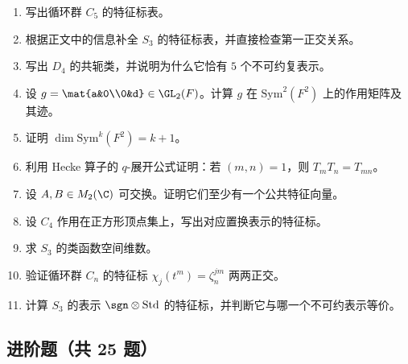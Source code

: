\begin{enumerate}[label={\textbf{习题8.\arabic*.}}, wide=0pt, leftmargin=3.2em]
\item \basic 写出循环群 $C_5$ 的特征标表。

\item \basic 根据正文中的信息补全 $S_3$ 的特征标表，并直接检查第一正交关系。

\item \basic 写出 $D_4$ 的共轭类，并说明为什么它恰有 $5$ 个不可约复表示。

\item \basic 设 $g=\mat{a&0\\0&d}\in \GL_2(F)$。计算 $g$ 在 $\mathrm{Sym}^2(F^2)$ 上的作用矩阵及其迹。

\item \basic 证明 $\dim \mathrm{Sym}^k(F^2)=k+1$。

\item \basic 利用 Hecke 算子的 $q$-展开公式证明：若 $(m,n)=1$，则 $T_mT_n=T_{mn}$。

\item \basic 设 $A,B\in M_2(\C)$ 可交换。证明它们至少有一个公共特征向量。

\item \basic 设 $C_4$ 作用在正方形顶点集上，写出对应置换表示的特征标。

\item \basic 求 $S_3$ 的类函数空间维数。

\item \basic 验证循环群 $C_n$ 的特征标 $\chi_j(t^m)=\zeta_n^{jm}$ 两两正交。

\item \basic 计算 $S_3$ 的表示 $\sgn\otimes \mathrm{Std}$ 的特征标，并判断它与哪一个不可约表示等价。
\end{enumerate}

\subsection*{进阶题（共 25 题）}

